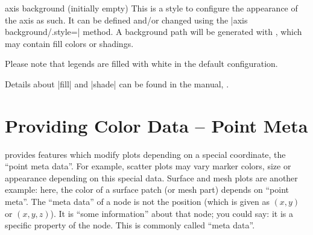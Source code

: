 \begin{pgfplotskey}{axis background (initially empty)}
    This is a style to configure the appearance of the axis as such. It can be
    defined and/or changed using the |axis background/.style=|
    method. A background path will be generated with , which may
    contain fill colors or shadings.
\pgfplotsexpensiveexample
\begin{codeexample}[]
\end{codeexample}

    Please note that legends are filled with white in the default
    configuration.
\begin{codeexample}[]
\end{codeexample}
    Details about |fill| and |shade| can be found in the \Tikz{} manual,
    \cite{tikz}.
\end{pgfplotskey}


\section{Providing Color Data -- Point Meta}
\label{pgfplots:point:meta}

\PGFPlots{} provides features which modify plots depending on a special
coordinate, the ``point meta data''. For example, scatter plots may vary marker
colors, size or appearance depending on this special data. Surface and mesh
plots are another example: here, the color of a surface patch (or mesh part)
depends on ``point meta''. The ``meta data'' of a node is not the position
(which is given as $(x,y)$ or $(x,y,z)$). It is ``some information'' about that
node; you could say: it is a specific property of the node. This is commonly
called ``meta data''.


